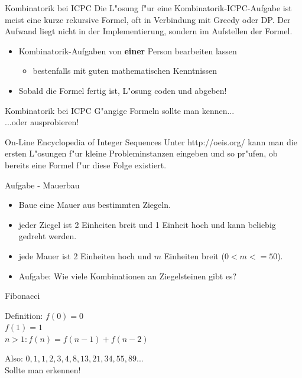 \documentclass[18pt]{beamer}
\begin{document}
\begin{frame}{Kombinatorik bei ICPC}
Die L"osung f"ur eine Kombinatorik-ICPC-Aufgabe ist meist eine kurze rekursive Formel, oft in Verbindung mit Greedy oder DP. Der Aufwand liegt nicht in der Implementierung, sondern im Aufstellen der Formel.
\begin{itemize}
\item Kombinatorik-Aufgaben von \textbf{einer} Person bearbeiten lassen

\begin{itemize}
\item bestenfalls mit guten mathematischen Kenntnissen
\end{itemize}

\item Sobald die Formel fertig ist, L"osung coden und abgeben!
\end{itemize}
\end{frame}

\begin{frame}{Kombinatorik bei ICPC}
G"angige Formeln sollte man kennen... \\
...oder ausprobieren! \\

\begin{block}{On-Line Encyclopedia of Integer Sequences}
Unter http://oeis.org/ kann man die ersten L"osungen f"ur kleine Probleminstanzen eingeben und so pr"ufen, ob bereits eine Formel f"ur diese Folge existiert.
\end{block}
\end{frame}


\begin{frame}{Aufgabe - Mauerbau}
\begin{itemize}
	\item Baue eine Mauer aus bestimmten Ziegeln.
	\item jeder Ziegel ist 2 Einheiten breit und 1 Einheit hoch und kann beliebig gedreht werden.
	\item jede Mauer ist 2 Einheiten hoch und \(m\) Einheiten breit (\(0<m<=50\)). 
	\item Aufgabe: Wie viele Kombinationen an Ziegelsteinen gibt es?
\end{itemize}
\end{frame}


\begin{frame}{Fibonacci}
\begin{block}{Definition:}
\(f(0)=0\)\\
\(f(1)=1\)\\
\(n>1: f(n)=f(n-1)+f(n-2)\)\\
\end{block}
Also: \(0, 1, 1, 2, 3, 4, 8, 13, 21, 34, 55, 89...\)\\

Sollte man erkennen!
\end{frame}
\end{document}
